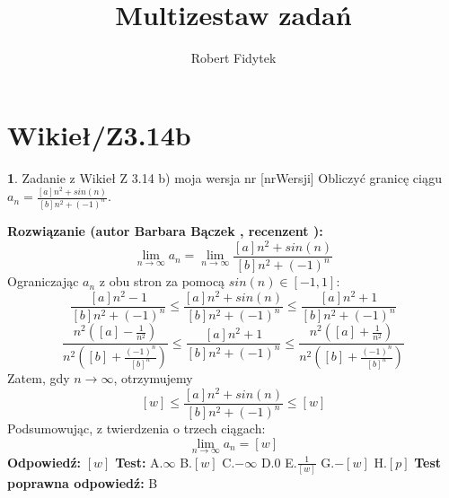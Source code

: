 \documentclass[12pt, a4paper]{article}
\title{Multizestaw zadań}
\author{Robert Fidytek}
\date{}
\theoremstyle{definition} %
\newtheorem{zad}{}
\newcommand{\kategoria}[1]{\section{#1}} %
\newcommand{\zadStart}[1]{\begin{zad}#1\newline} %
\newcommand{\zadStop}{\end{zad}}   %
\newcommand{\rozwStart}[2]{\noindent \textbf{Rozwiązanie (autor #1 , recenzent #2): }\newline} %
\newcommand{\rozwStop}{\newline}                                            %
\newcommand{\odpStart}{\noindent \textbf{Odpowiedź:}\newline}    %
\newcommand{\odpStop}{\newline}                                             %
\newcommand{\testStart}{\noindent \textbf{Test:}\newline} %
\newcommand{\testStop}{\newline} %
\newcommand{\kluczStart}{\noindent \textbf{Test poprawna odpowiedź:}\newline} %
\newcommand{\kluczStop}{\newline} %
\begin{document}
\maketitle


\kategoria{Wikieł/Z3.14b}
\zadStart{Zadanie z Wikieł Z 3.14 b) moja wersja nr [nrWersji]}
Obliczyć granicę ciągu $a_n= \frac{[a]n^2+ sin(n)}{[b]n^2 + {(-1)}^n}$.
\zadStop
\rozwStart{Barbara Bączek}{}
$$\lim_{n \rightarrow \infty} a_n= \lim_{n \rightarrow \infty} \frac{[a]n^2+ sin(n)}{[b]n^2 + {(-1)}^n}$$
Ograniczając $a_n$ z obu stron za pomocą $sin(n) \in [-1,1]$:
$$ \frac{[a]n^2 - 1}{[b]n^2 + {(-1)}^n}  \leq \frac{[a]n^2+ sin(n)}{[b]n^2 + {(-1)}^n} \leq \frac{[a]n^2+ 1}{[b]n^2 + {(-1)}^n} $$
$$ \frac{n^2( [a] - \frac{1}{n^2})}{n^2( [b] +\frac{{(-1)}^n}{{[b]}^n})} \leq  \frac{[a]n^2+ 1}{[b]n^2 + {(-1)}^n} \leq \frac{n^2( [a] + \frac{1}{n^2})}{n^2( [b] +\frac{{(-1)}^n}{{[b]}^n})}$$
Zatem, gdy $n \rightarrow \infty$, otrzymujemy
$$ [w] \leq \frac{[a]n^2+ sin(n)}{[b]n^2 + {(-1)}^n} \leq [w] $$
Podsumowując, z twierdzenia o trzech ciągach:  $$\lim_{n \rightarrow \infty} a_n= [w]$$
\rozwStop
\odpStart
$[w]$
\odpStop
\testStart
A.$\infty$
B.$[w]$
C.$-\infty$
D.$0$
E.$\frac{1}{[w]}$
G.$-[w]$
H.$[p]$
\testStop
\kluczStart
B
\kluczStop
\end{document}
